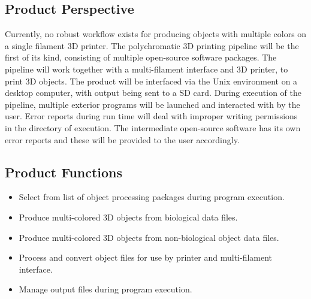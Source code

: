 \documentclass[letterpaper, onecolumn, draftclsnofoot, 10pt, compsoc]{IEEEtran}
\begin{document}
	\subsection{Product Perspective} %
	Currently, no robust workflow exists for producing objects with multiple colors on a single filament 3D printer.
	The polychromatic 3D printing pipeline will be the first of its kind, consisting of multiple open-source software packages. 
	The pipeline will work together with a multi-filament interface and 3D printer, to print 3D objects. 
	The product will be interfaced via the Unix environment on a desktop computer, with output being sent to a SD card.
    During execution of the pipeline, multiple exterior programs will be launched and interacted with by the user. 
    Error reports during run time will deal with improper writing permissions in the directory of execution.
    The intermediate open-source software has its own error reports and these will be provided to the user accordingly.
    
\subsection{Product Functions} %
\begin{itemize}
	\item Select from list of object processing packages during program execution. 
	\item Produce multi-colored 3D objects from biological data files.
    \item Produce multi-colored 3D objects from non-biological object data files.
    \item Process and convert object files for use by printer and multi-filament interface.
    \item Manage output files during program execution.
\end{itemize}
\end{document}
